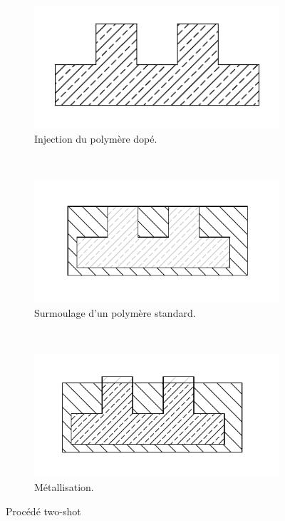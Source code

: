 \begin{figure}[h]
        \centering
        \begin{subfigure}[t]{0.3\textwidth}
                \includegraphics[width=\textwidth]{images/two-shot-example/inner}
                \caption{Injection du polymère dopé.}
                \label{fig:first-shot}
        \end{subfigure}%
        ~ 
        \begin{subfigure}[t]{0.3\textwidth}
                \includegraphics[width=\textwidth]{images/two-shot-example/second_shot}
                \caption{Surmoulage d'un polymère standard.}
                \label{fig:second-shot}
        \end{subfigure}
        ~
        \begin{subfigure}[t]{0.3\textwidth}
                \includegraphics[width=\textwidth]{images/two-shot-example/after_metal}
                \caption{Métallisation.}
                \label{fig:two-shot-metal}
        \end{subfigure}
        \caption{Procédé two-shot}\label{fig:two-shot-process}
\end{figure}


